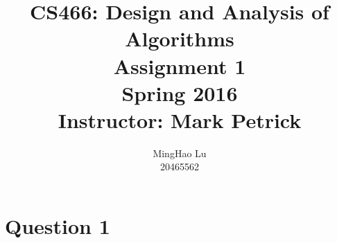 \documentclass{article}
\title{CS466: Design and Analysis of Algorithms \\ Assignment 1 \\ Spring 2016 \\ Instructor: Mark Petrick}
\author{MingHao Lu \\ 20465562}
\begin{document}
    \maketitle
    \newpage

\section*{Question 1}
\end{document}
